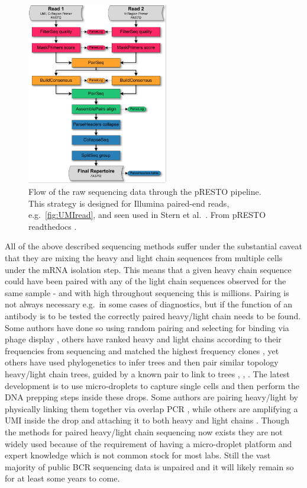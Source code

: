 \begin{figure}[ht]
    \centering
    \includegraphics[width=0.55\textwidth]{figures/Stern2014_Flowchart.pdf}
    \caption{
        \label{fig:UMIread_flow}
        Flow of the raw sequencing data through the pRESTO pipeline. This strategy is designed for Illumina paired-end reads, e.g.\ \ref{fig:UMIread}, and seen used in Stern et al.\ \cite{stern2014b}. From pRESTO readthedocs \cite{vander2014presto}.
    }
\end{figure}


All of the above described sequencing methods suffer under the substantial caveat that they are mixing the heavy and light chain sequences from multiple cells under the mRNA isolation step.
This means that a given heavy chain sequence could have been paired with any of the light chain sequences observed for the same sample - and with high throughout sequencing this is millions.
Pairing is not always necessary e.g.\ in some cases of diagnostics, but if the function of an antibody is to be tested the correctly paired heavy/light chain needs to be found.
Some authors have done so using random pairing and selecting for binding via phage display \cite{glanville2009precise}, others have ranked heavy and light chains according to their frequencies from sequencing and matched the highest frequency clones \cite{reddy2010monoclonal}, yet others have used phylogenetics to infer trees and then pair similar topology heavy/light chain trees, guided by a known pair to link to trees \cite{Zhu_undated-zz}, \cite{kwong2017antibodyomics}, \cite{huang2016identification}.
The latest development is to use micro-droplets to capture single cells and then perform the DNA prepping steps inside these drops.
Some authors are pairing heavy/light by physically linking them together via overlap PCR \cite{mcdaniel2016ultra}, while others are amplifying a UMI inside the drop and attaching it to both heavy and light chains \cite{Briggs134841}.
Though the methods for paired heavy/light chain sequencing now exists they are not widely used because of the requirement of having a micro-droplet platform and expert knowledge which is not common stock for most labs.
Still the vast majority of public BCR sequencing data is unpaired and it will likely remain so for at least some years to come.



